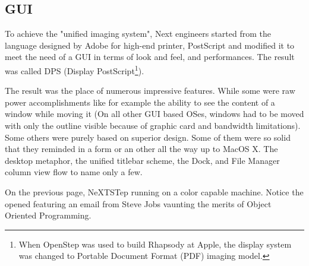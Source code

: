 \subsection{GUI}
 To achieve the "unified imaging system", Next engineers started from the language designed by Adobe for high-end printer, PostScript and modified it to meet the need of a GUI in terms of look and feel, and performances. The result was called DPS (Display PostScript\footnote{When OpenStep was used to build Rhapsody at Apple, the display system was changed to Portable Document Format (PDF) imaging model.}).\\
\par
{}
\par
The result was the place of numerous impressive features. While some were raw power accomplishments like for example the ability to see the content of a window while moving it (On all other GUI based OSes, windows had to be moved with only the outline visible because of graphic card and bandwidth limitations). Some others were purely based on superior design. Some of them were so solid that they reminded in a form or an other all the way up to MacOS X. The desktop metaphor, the unified titlebar scheme, the Dock, and File Manager column view flow to name only a few.




\par
\vspace{6mm}
\par
On the previous page, NeXTSTep running on a color capable machine. Notice the opened  featuring an email from Steve Jobs vaunting the merits of Object Oriented Programming.

